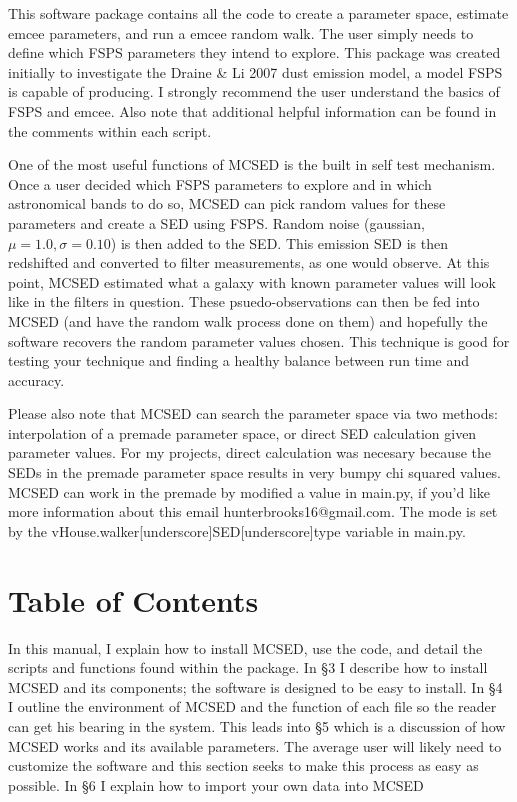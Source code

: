 \documentclass[12pt,a4paper]{article}
\begin{document}
This software package contains all the code to create a parameter space, estimate emcee parameters, and run a emcee random walk.  The user simply needs to define which FSPS parameters they intend to explore.  This package was created initially to investigate the Draine \& Li 2007 dust emission model, a model FSPS is capable of producing.  I strongly recommend the user understand the basics of FSPS and emcee.  Also note that additional helpful information can be found in the comments within each script.

One of the most useful functions of MCSED is the built in self test mechanism.  Once a user decided which FSPS parameters to explore and in which astronomical bands to do so, MCSED can pick random values for these parameters and create a SED using FSPS.  Random noise (gaussian, $\mu = 1.0, \sigma = 0.10$) is then added to the SED.  This emission SED is then redshifted and converted to filter measurements, as one would observe.  At this point, MCSED estimated what a galaxy with known parameter values will look like in the filters in question.  These psuedo-observations can then be fed into MCSED (and have the random walk process done on them) and hopefully the software recovers the random parameter values chosen.  This technique is good for testing your technique and finding a healthy balance between run time and accuracy.  

Please also note that MCSED can search the parameter space via two methods: interpolation of a premade parameter space, or direct SED calculation given parameter values.  For my projects, direct calculation was necesary because the SEDs in the premade parameter space results in very bumpy chi squared values.  MCSED can work in the premade by modified a value in main.py, if you'd like more information about this email hunterbrooks16@gmail.com.  The mode is set by the vHouse.walker[underscore]SED[underscore]type variable in main.py.


\section{Table of Contents}

In this manual, I explain how to install MCSED, use the code, and detail the scripts and functions found within the package. In \S 3 I describe how to install MCSED and its components; the software is designed to be easy to install.  In \S 4 I outline the environment of MCSED and the function of each file so the reader can get his bearing in the system.  This leads into \S 5 which is a discussion of how MCSED works and its available parameters.  The average user will likely need to customize the software and this section seeks to make this process as easy as possible.  In \S 6 I explain how to import your own data into MCSED
\end{document}
